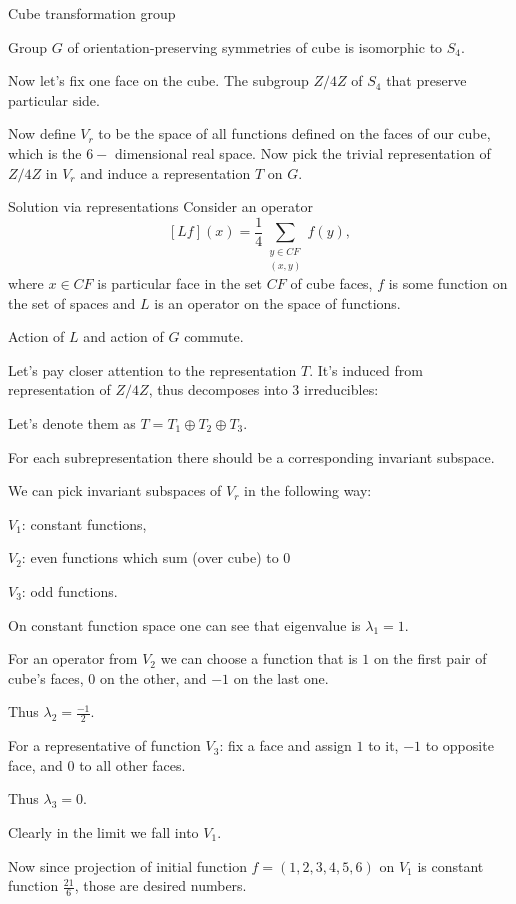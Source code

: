 \documentclass{beamer}
\begin{document}
\begin{frame}{Cube transformation group}
    \begin{lemma}
        Group $G$ of orientation-preserving symmetries of cube is isomorphic to $S_4$.
    \end{lemma}
    Now let's fix one face on the cube. The subgroup $Z/4Z$ of $S_4$ that preserve particular side.

    Now define $V_r$ to be the space of all functions defined on the faces of our cube, which is the $6-$ dimensional real space. Now pick the trivial representation of $Z/4Z$ in $V_r$ and induce a representation $T$ on $G$.
\end{frame}

\begin{frame}{Solution via representations}
    Consider an operator $$[Lf] (x) = \frac{1}{4}\sum_{\substack{y\in CF \\ (x, y)}} f(y),$$
    where $x \in CF$ is particular face in the set $CF$ of cube faces, $f$ is some function on the set of spaces and $L$ is an operator on the space of functions.
    
    \begin{lemma}
        Action of $L$ and action of $G$ commute.
    \end{lemma}

    Let's pay closer attention to the representation $T$. It's induced from representation of $Z/4Z$, thus decomposes into 3 irreducibles:

    Let's denote them as  $T = T_1 \oplus T_2 \oplus T_3$.
\end{frame}


\begin{frame}
    For each subrepresentation there should be a corresponding invariant subspace.

    We can pick invariant subspaces of $V_r$ in the following way: 
    
    $V_1$: constant functions, 
    
    $V_2$: even functions which sum (over cube) to 0 
    
    $V_3$: odd functions.
    
 \end{frame}

 \begin{frame}
    On constant function space one can see that eigenvalue is $\lambda_1=1$. 
    
    For an operator from $V_2$ we can choose a function that is $1$ on the first pair of cube's faces, $0$ on the other, and $-1$ on the last one.
    
    Thus $\lambda_2 = \frac{-1}{2}$. 

    
    For a representative of function $V_3$: fix a face and assign $1$ to it, $-1$ to opposite face, and $0$ to all other faces. 
    
    Thus $\lambda_3 = 0$.

    Clearly in the limit we fall into $V_1$. 

    Now since projection of initial function $f = (1,2,3,4,5,6)$ on $V_1$ is constant function $\frac{21}{6}$, those are desired numbers.
 \end{frame}
\end{document}
